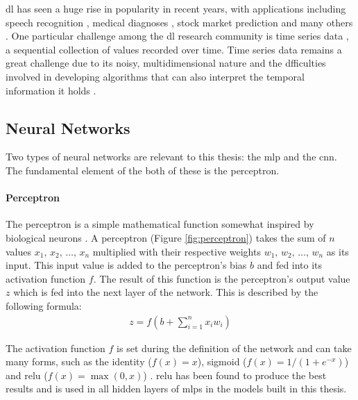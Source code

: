 \ac{dl} has seen a huge rise in popularity in recent years, with applications including speech recognition \cite[]{deng_machine_2013}, medical diagnoses \cite[]{lee_diagnosis_2018}, stock market prediction \cite[]{krollner_financial_2010} and many others \cite[]{kelleher_fundamentals_2015}. One particular challenge among the \ac{dl} research community is time series data \cite[]{yang_10_2006}, a sequential collection of values recorded over time. Time series data remains a great challenge due to its noisy, multidimensional nature \cite[]{kelleher_fundamentals_2015} and the dfficulties involved in developing algorithms that can also interpret the temporal information it holds \cite[]{bagnall_great_2017}.

\subsection{Neural Networks}
Two types of neural networks are relevant to this thesis: the \ac{mlp} and the \ac{cnn}. The fundamental element of the both of these is the perceptron.

\paragraph*{Perceptron}
The perceptron is a simple mathematical function somewhat inspired by biological neurons \cite{rosenblatt_perceptron_1958}. A perceptron (Figure \ref{fig:perceptron}) takes the sum of \(n\) values \(x_{1},\,x_{2},\,\ldots,\,x_{n}\) multiplied with their respective weights \(w_{1},\,w_{2},\,\ldots,\,w_{n}\) as its input. This input value is added to the perceptron's bias \(b\) and fed into its activation function \(f\). The result of this function is the perceptron's output value \(z\) which is fed into the next layer of the network. This is described by the following formula:
\begin{align}
    z = f\left(b + \sum_{i = 1}^{n}x_{i}w_{i}\right)
\end{align}


The activation function \(f\) is set during the definition of the network and can take many forms, such as the identity (\(f\left(x\right) = x\)), sigmoid (\(f\left(x\right) = 1 / \left(1 + e^{-x}\right)\)) and \ac{relu} (\(f\left(x\right) = \max\left(0, x\right)\)) \cite[]{hahnloser_digital_2000}. \ac{relu} has been found to produce the best results \cite[]{jarrett_what_2009} and is used in all hidden layers of \ac{mlp}s in the models built in this thesis.

